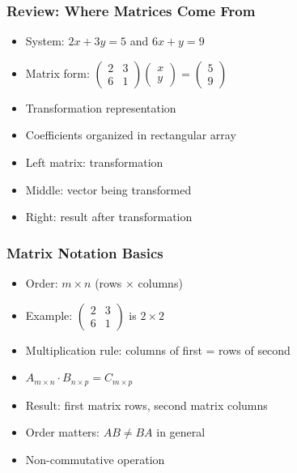 \begin{frame}[fragile]\frametitle{Review: Where Matrices Come From}
  \begin{itemize}
    \item System: $2x + 3y = 5$ and $6x + y = 9$
    \item Matrix form: $\begin{pmatrix} 2 & 3 \\ 6 & 1 \end{pmatrix} \begin{pmatrix} x \\ y \end{pmatrix} = \begin{pmatrix} 5 \\ 9 \end{pmatrix}$
    \item Transformation representation
    \item Coefficients organized in rectangular array
    \item Left matrix: transformation
    \item Middle: vector being transformed
    \item Right: result after transformation
  \end{itemize}
\end{frame}

\begin{frame}[fragile]\frametitle{Matrix Notation Basics}
  \begin{itemize}
    \item Order: $m \times n$ (rows $\times$ columns)
    \item Example: $\begin{pmatrix} 2 & 3 \\ 6 & 1 \end{pmatrix}$ is $2 \times 2$
    \item Multiplication rule: columns of first = rows of second
    \item $A_{m \times n} \cdot B_{n \times p} = C_{m \times p}$
    \item Result: first matrix rows, second matrix columns
    \item Order matters: $AB \neq BA$ in general
    \item Non-commutative operation
  \end{itemize}
\end{frame}

